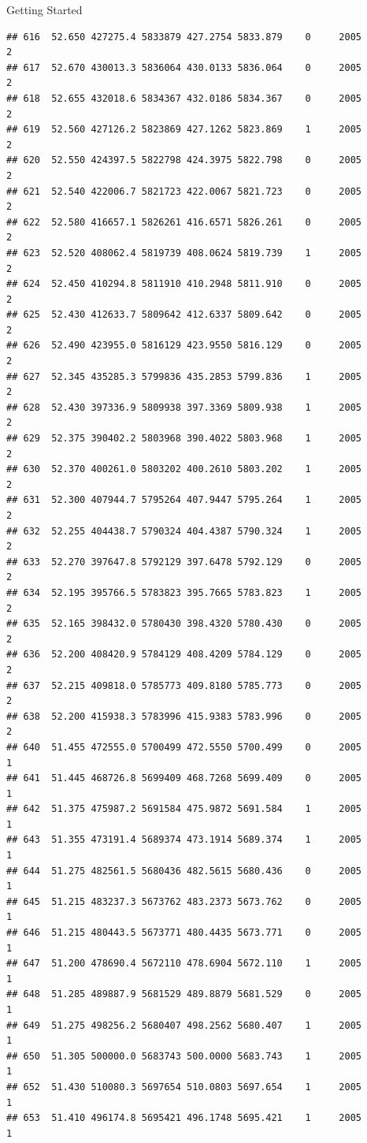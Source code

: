 \documentclass[
  ignorenonframetext,
]{beamer}
\begin{document}
\begin{frame}[fragile]{Getting Started}
\begin{verbatim}
## 616  52.650 427275.4 5833879 427.2754 5833.879    0     2005        2
## 617  52.670 430013.3 5836064 430.0133 5836.064    0     2005        2
## 618  52.655 432018.6 5834367 432.0186 5834.367    0     2005        2
## 619  52.560 427126.2 5823869 427.1262 5823.869    1     2005        2
## 620  52.550 424397.5 5822798 424.3975 5822.798    0     2005        2
## 621  52.540 422006.7 5821723 422.0067 5821.723    0     2005        2
## 622  52.580 416657.1 5826261 416.6571 5826.261    0     2005        2
## 623  52.520 408062.4 5819739 408.0624 5819.739    1     2005        2
## 624  52.450 410294.8 5811910 410.2948 5811.910    0     2005        2
## 625  52.430 412633.7 5809642 412.6337 5809.642    0     2005        2
## 626  52.490 423955.0 5816129 423.9550 5816.129    0     2005        2
## 627  52.345 435285.3 5799836 435.2853 5799.836    1     2005        2
## 628  52.430 397336.9 5809938 397.3369 5809.938    1     2005        2
## 629  52.375 390402.2 5803968 390.4022 5803.968    1     2005        2
## 630  52.370 400261.0 5803202 400.2610 5803.202    1     2005        2
## 631  52.300 407944.7 5795264 407.9447 5795.264    1     2005        2
## 632  52.255 404438.7 5790324 404.4387 5790.324    1     2005        2
## 633  52.270 397647.8 5792129 397.6478 5792.129    0     2005        2
## 634  52.195 395766.5 5783823 395.7665 5783.823    1     2005        2
## 635  52.165 398432.0 5780430 398.4320 5780.430    0     2005        2
## 636  52.200 408420.9 5784129 408.4209 5784.129    0     2005        2
## 637  52.215 409818.0 5785773 409.8180 5785.773    0     2005        2
## 638  52.200 415938.3 5783996 415.9383 5783.996    0     2005        2
## 640  51.455 472555.0 5700499 472.5550 5700.499    0     2005        1
## 641  51.445 468726.8 5699409 468.7268 5699.409    0     2005        1
## 642  51.375 475987.2 5691584 475.9872 5691.584    1     2005        1
## 643  51.355 473191.4 5689374 473.1914 5689.374    1     2005        1
## 644  51.275 482561.5 5680436 482.5615 5680.436    0     2005        1
## 645  51.215 483237.3 5673762 483.2373 5673.762    0     2005        1
## 646  51.215 480443.5 5673771 480.4435 5673.771    0     2005        1
## 647  51.200 478690.4 5672110 478.6904 5672.110    1     2005        1
## 648  51.285 489887.9 5681529 489.8879 5681.529    0     2005        1
## 649  51.275 498256.2 5680407 498.2562 5680.407    1     2005        1
## 650  51.305 500000.0 5683743 500.0000 5683.743    1     2005        1
## 652  51.430 510080.3 5697654 510.0803 5697.654    1     2005        1
## 653  51.410 496174.8 5695421 496.1748 5695.421    1     2005        1

\end{verbatim}
\end{frame}
\end{document}
